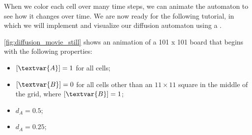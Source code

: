 When we color each cell over many time steps, we can animate the automaton to see how it changes over time. We are now ready for the following tutorial, in which we will implement and visualize our diffusion automaton using a .


\autoref{fig:diffusion_movie_still} shows an animation of a 101 x 101 board that begins with the following properties:
\begin{itemize}
\item $[\textvar{A}] = 1$ for all cells;
\item $[\textvar{B}] = 0$ for all cells other than an $11 \times 11$ square in the middle of the grid, where $[\textvar{B}] = 1$;
\item $d_A = 0.5$;
\item $d_A = 0.25$;
\end{itemize}

